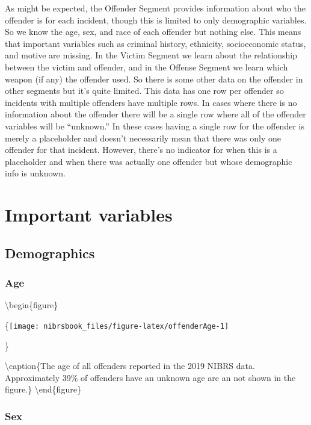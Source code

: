 \documentclass[
  12pt,
  openany]{book}
\begin{document}
As might be expected, the Offender Segment provides information about who the offender is for each incident, though this is limited to only demographic variables. So we know the age, sex, and race of each offender but nothing else. This means that important variables such as criminal history, ethnicity, socioeconomic status, and motive are missing. In the Victim Segment we learn about the relationship between the victim and offender, and in the Offense Segment we learn which weapon (if any) the offender used. So there is some other data on the offender in other segments but it's quite limited. This data has one row per offender so incidents with multiple offenders have multiple rows. In cases where there is no information about the offender there will be a single row where all of the offender variables will be ``unknown.'' In these cases having a single row for the offender is merely a placeholder and doesn't necessarily mean that there was only one offender for that incident. However, there's no indicator for when this is a placeholder and when there was actually one offender but whose demographic info is unknown.

\hypertarget{important-variables-2}{%
\section{Important variables}\label{important-variables-2}}

\hypertarget{demographics}{%
\subsection{Demographics}\label{demographics}}

\hypertarget{age}{%
\subsubsection{Age}\label{age}}

\textbackslash begin\{figure\}

\{\centering \texttt{[image: nibrsbook\_files/figure-latex/offenderAge-1]}

\}

\textbackslash caption\{The age of all offenders reported in the 2019 NIBRS data. Approximately 39\% of offenders have an unknown age are an not shown in the figure.\}\label{fig:offenderAge}
\textbackslash end\{figure\}

\hypertarget{sex}{%
\subsubsection{Sex}\label{sex}}
\end{document}
